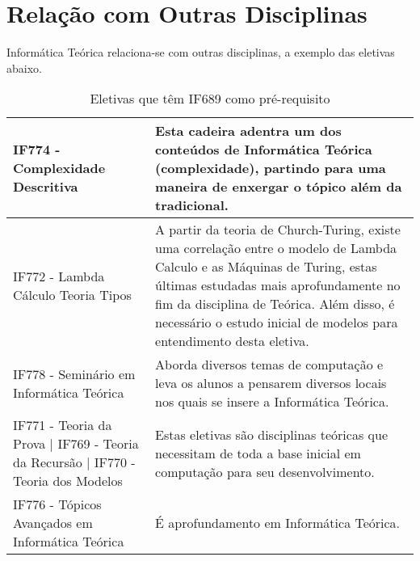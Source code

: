 \documentclass[a4paper]{article}
\begin{document}
    
\section{Relação com Outras Disciplinas}
Informática Teórica relaciona-se com outras disciplinas, a exemplo das eletivas abaixo.

\begin{table}[h]
\centering
\begin{tabular}{|p{7.0cm}|p{9.0cm}|}
\hline
IF774 -  Complexidade Descritiva & Esta cadeira adentra um dos conteúdos de Informática Teórica (complexidade), partindo para uma maneira de enxergar o tópico além da tradicional.   \\ \hline
IF772 - Lambda Cálculo Teoria Tipos & A partir da teoria de Church-Turing, existe uma correlação entre o modelo de Lambda Calculo e as Máquinas de Turing, estas últimas estudadas mais aprofundamente no fim da disciplina de Teórica. Além disso, é necessário o estudo inicial de modelos para entendimento desta eletiva. \\ \hline
IF778 - Seminário em Informática Teórica & Aborda diversos temas de computação e leva os alunos a pensarem diversos locais nos quais se insere a Informática Teórica. \\ \hline
IF771 - Teoria da Prova | IF769 - Teoria da Recursão | IF770 - Teoria dos Modelos & Estas eletivas são disciplinas teóricas que necessitam de toda a base inicial em computação para seu desenvolvimento.  \\ \hline
IF776 - Tópicos Avançados em Informática Teórica & É aprofundamento em Informática Teórica.  \\ \hline
\end{tabular}
\caption{Eletivas que têm IF689 como pré-requisito}
\end{table}



\end{document}

